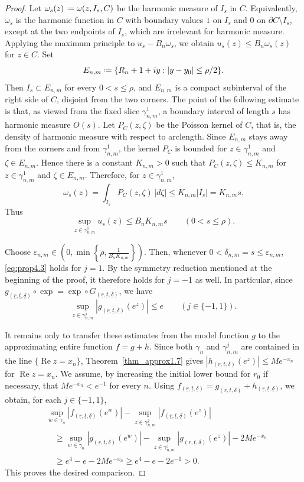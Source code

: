 \documentclass[a4paper, 11pt, reqno]{amsart}
\numberwithin{equation}{section}
\theoremstyle{plain}
\newcommand*{\defeq}{\mathrel{\vcenter{\baselineskip0.5ex \lineskiplimit0pt
 \hbox{\scriptsize.}\hbox{\scriptsize.}}}=}
\theoremstyle{remark}
\newcommand{\uldelta}{\underline{\delta}}
\newcommand{\ulr}{\underline{r}}
\newcommand{\ult}{\underline{t}}
\newcommand{\Rea}{\operatorname{Re }}
\begin{document}
\begin{proof}
	Let
	$
	\omega_s(z)\defeq \omega(z,I_s,C)
	$
	be the harmonic measure of \(I_s\) in \(C\). Equivalently, \(\omega_s\) is the
	harmonic function in \(C\) with boundary values \(1\) on \(I_s\) and \(0\) on
	\(\partial C\setminus I_s\), except at the two endpoints of \(I_s\), which are
	irrelevant for harmonic measure. Applying the maximum principle to
	\(u_s-B_{n}\omega_s\), we obtain
	$
	u_s(z)\le B_{n}\omega_s(z) 
	$
	for $z\in C$.
	Set
	\[
	E_{n,m}\defeq
	\{R_{n}+1+iy: |y-y_0|\le \rho/2\}.
	\]
	Then \(I_s\subset E_{n,m}\) for every \(0<s\le\rho\), and \(E_{n,m}\) is a
	compact subinterval of the right side of \(C\), disjoint from the two corners.
	The point of the following estimate is that, as viewed from the fixed slice \(\gamma^1_{n,m}\), a boundary interval of length \(s\) has harmonic measure \(O(s)\). Let \(P_C(z,\zeta)\) be the Poisson kernel of \(C\), that is, the density of harmonic measure with respect to arclength. Since \(E_{n,m}\) stays away from the corners and from \(\gamma^1_{n,m}\), the kernel \(P_C\) is bounded for \(z\in\gamma^1_{n,m}\) and \(\zeta\in E_{n,m}\). Hence there is a constant \(K_{n,m}>0\) such that
	$
	P_C(z,\zeta)\le K_{n,m}$ for $z\in\gamma^{1}_{n,m}$ and $\zeta\in E_{n,m}.$
	Therefore, for \(z\in\gamma^{1}_{n,m}\),
	\[
	\omega_s(z)
	=
	\int_{I_s}P_C(z,\zeta)\,|d\zeta|
	\le K_{n,m}|I_s|
	=
	K_{n,m}s.
	\]
	Thus
	\[
	\sup_{z\in\gamma^{1}_{n,m}}u_s(z)
	\le B_{n}K_{n,m}s
	\qquad (0<s\le\rho).
	\]
	
	Choose
	$
	\varepsilon_{n,m}\in
	\left(0,\min\left\{\rho,\frac1{B_nK_{n,m}}\right\}\right).
	$
	Then, whenever \(0<\delta_{n,m}=s\leq\varepsilon_{n,m}\), \eqref{eq:prop4.3} holds for \(j=1\). By the symmetry reduction mentioned at the beginning of the proof, it therefore holds for \(j=-1\) as well. In particular, since \(g_{(\ulr,\ult,\uldelta)}\circ\exp
	=
	\exp\circ G_{(\ulr,\ult,\uldelta)}\), we have
	\[
	\sup_{z\in\gamma^{j}_{n,m}}
	|g_{(\ulr,\ult,\uldelta)}(e^z)|\le e
	\qquad (j\in\{-1,1\}).
	\]
	
	It remains only to transfer these estimates from the model function \(g\) to the approximating entire function \(f=g+h\). Since both
	\(\gamma_n\) and \(\gamma^j_{n,m}\) are contained in the line
	\(\{\Rea z=x_n\}\), Theorem~\ref{thm_approx1.7} gives $|h_{(\ulr,\ult,\uldelta)}(e^z)|\le Me^{-x_n}$
	for $\Rea z=x_n$. We assume, by increasing the initial lower bound for \(r_0\) if necessary, that
	\(Me^{-x_n}<e^{-1}\) for every \(n\). Using
	\(f_{(\ulr,\ult,\uldelta)}
	=
	g_{(\ulr,\ult,\uldelta)}
	+
	h_{(\ulr,\ult,\uldelta)}\), we obtain, for each \(j\in\{-1,1\}\),
	\[
	\begin{aligned}
		&\sup_{w\in\gamma_n}|f_{(\ulr,\ult,\uldelta)}(e^w)|
		-
		\sup_{z\in\gamma^j_{n,m}}|f_{(\ulr,\ult,\uldelta)}(e^z)|  \\
		&\quad\ge
		\sup_{w\in\gamma_n}|g_{(\ulr,\ult,\uldelta)}(e^w)|
		-
		\sup_{z\in\gamma^j_{n,m}}|g_{(\ulr,\ult,\uldelta)}(e^z)|
		-2Me^{-x_n}  \\
		&\quad\ge e^4-e-2Me^{-x_n}\ge e^4-e-2e^{-1}>0.
	\end{aligned}
	\]
	This proves the desired comparison.
\end{proof}
\end{document}
